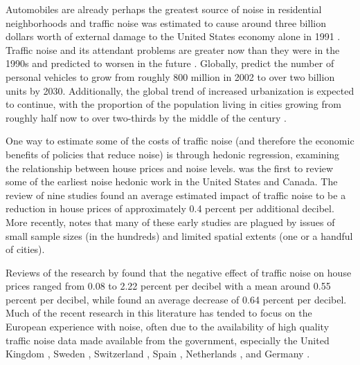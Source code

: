 \documentclass{article}\usepackage[]{graphicx}\usepackage[]{color}
\begin{document}
Automobiles are already perhaps the greatest source of noise in residential neighborhoods \citep{Barber2010} and traffic noise was estimated to cause around three billion dollars worth of external damage to the United States economy alone in 1991 \citep{Delucchi1998}. Traffic noise and its attendant problems are greater now than they were in the 1990s and predicted to worsen in the future \citep{Goines2007}.  %
Globally, \citet{Dargay2007} predict the number of personal vehicles to grow from roughly 800 million in 2002 to over two billion units by 2030. Additionally, the global trend of increased urbanization is expected to continue, with the proportion of the population living in cities growing from roughly half now to over two-thirds by the middle of the century . 

One way to estimate some of the costs of traffic noise (and therefore the economic benefits of policies that reduce noise) is through hedonic regression, examining the relationship between house prices and noise levels. \citet{Nelson1982} was the first to review some of the earliest noise hedonic work in the United States and Canada. The review of nine studies found an average estimated impact of traffic noise to be a reduction in house prices of approximately 0.4 percent per additional decibel. More recently, \citet{Nelson2008} notes that many of these early studies \citep[such as][]{Gamble1974, Langley1976} are plagued by issues of small sample sizes (in the hundreds) and limited spatial extents (one or a handful of cities). 

Reviews of the research by \citet{Bateman2001} found that the negative effect of traffic noise on house prices ranged from 0.08 to 2.22 percent per decibel with a mean around 0.55 percent per decibel, while \citet{Navrud2002} found an average decrease of 0.64 percent per decibel. Much of the recent research in this literature has tended to focus on the European experience with noise, often due to the availability of high quality traffic noise data made available from the government, especially the United Kingdom \citep{Day2007, Blanco2011}, Sweden \citep{Wilhelmsson2000, Andersson2010}, Switzerland \citep{Baranzini2010}, Spain \citep{MarmolejoDuarteCarlos;GonzalezTamez2009}, Netherlands \citep{Theebe2004a}, and Germany \citep{Brandt2011}. 
\end{document}
